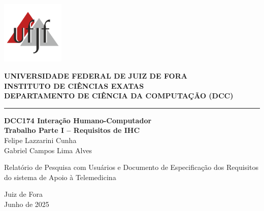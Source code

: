 \documentclass[12pt, a4paper, oneside]{abntex2}
\begin{document}
\begin{folhaderosto}
    \centering
    \begin{minipage}{0.2\textwidth}
        \includegraphics[width=3cm]{Imagens/ufjf-logo.png}
    \end{minipage}
    \hfill
    \begin{minipage}{0.7\textwidth}
        \raggedright
        \textbf{UNIVERSIDADE FEDERAL DE JUIZ DE FORA} \\
        \textbf{INSTITUTO DE CIÊNCIAS EXATAS} \\
        \textbf{DEPARTAMENTO DE CIÊNCIA DA COMPUTAÇÃO (DCC)}
    \end{minipage}
    \vspace*{3cm}
    \rule{\textwidth}{0pt}
    \textbf{\Large DCC174 Interação Humano-Computador} \\
    \vspace{0.5cm}
    \textbf{\Large Trabalho Parte I – Requisitos de IHC} \\
    \vspace{3cm}
    Felipe Lazzarini Cunha \\
    Gabriel Campos Lima Alves \\
    \vspace*{3cm}
    \hfill
    \begin{minipage}{0.6\textwidth}
        \raggedright
        Relatório de Pesquisa com Usuários e Documento de Especificação dos Requisitos do sistema de Apoio à Telemedicina
    \end{minipage}
    \vfill
    \vspace*{1cm}
    \begin{center}
    Juiz de Fora\\
    Junho de 2025
    \end{center}
\end{folhaderosto}

\tableofcontents
\cleardoublepage

\textual

\end{document}

